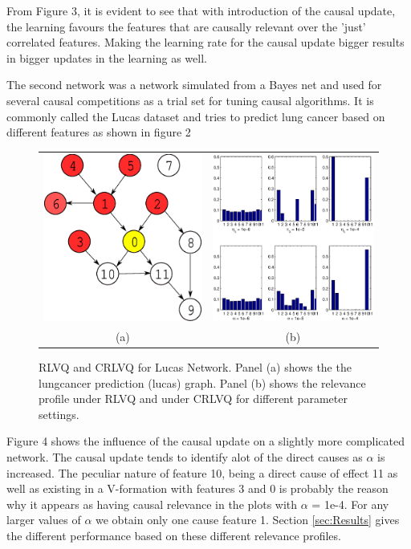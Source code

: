 \documentclass{esannV2}
\begin{document}
From Figure 3, it is evident to see that with introduction of the causal update, the learning favours the features that are causally relevant over the 'just' correlated features. Making the learning rate for the causal update bigger results in bigger updates in the learning as well.

The second network was a network simulated from a Bayes net and used for several causal competitions as a trial set for tuning causal algorithms. It is commonly called the Lucas dataset\cite{12} and tries to predict lung cancer based on different features as shown in figure 2\\

\begin{figure}[!h]
\begin{tabular}{cc}
\includegraphics[width=.3\textwidth]{lucasgraph.eps} & 
\includegraphics[width=.7\textwidth, height=0.6\textwidth]{lucaslambda.eps} \\
(a) &  (b)  
\end{tabular}
\label{fig:lucas}
\caption{RLVQ and CRLVQ for Lucas Network. Panel (a) shows the the lungcancer prediction (lucas) graph. Panel (b) shows the relevance profile under RLVQ and under CRLVQ for different parameter settings.}
\end{figure}

Figure 4 shows the influence of the causal update on a slightly more complicated network. The causal update tends to identify alot of the direct causes as $\alpha$ is increased. The peculiar nature of feature 10, being a direct cause of effect 11 as well as existing in a V-formation with features 3 and 0 is probably the reason why it appears as having causal relevance in the plots with $\alpha$ = 1e-4. For any larger values of $\alpha$ we obtain only one cause feature 1. Section \ref{sec:Results} gives the different performance based on these different relevance profiles.
\end{document}
